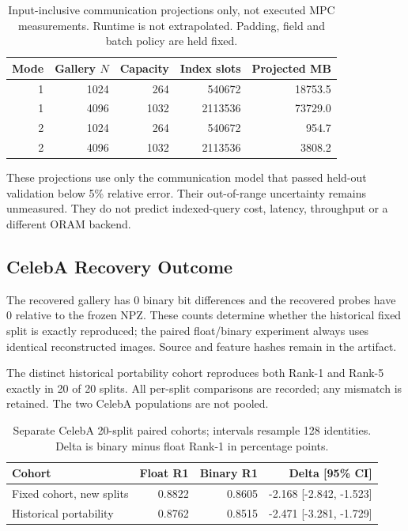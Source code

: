 \begin{table}[H]
\caption{Input-inclusive communication projections only, not executed MPC measurements. Runtime is not extrapolated. Padding, field and batch policy are held fixed.}
\label{tab:projections}\centering\small
\setlength{\tabcolsep}{3pt}
\begin{tabular}{rrrrr}
\toprule
Mode & Gallery $N$ & Capacity & Index slots & Projected MB \\
\midrule
1 & 1024 & 264 & 540672 & 18753.5 \\
1 & 4096 & 1032 & 2113536 & 73729.0 \\
2 & 1024 & 264 & 540672 & 954.7 \\
2 & 4096 & 1032 & 2113536 & 3808.2 \\
\bottomrule
\end{tabular}
\end{table}

These projections use only the communication model that passed held-out validation below 5\% relative error. Their out-of-range uncertainty remains unmeasured. They do not predict indexed-query cost, latency, throughput or a different ORAM backend.

\subsection{CelebA Recovery Outcome}

The recovered gallery has 0 binary bit differences and the recovered probes have 0 relative to the frozen NPZ. These counts determine whether the historical fixed split is exactly reproduced; the paired float/binary experiment always uses identical reconstructed images. Source and feature hashes remain in the artifact.

The distinct historical portability cohort reproduces both Rank-1 and Rank-5 exactly in 20 of 20 splits. All per-split comparisons are recorded; any mismatch is retained. The two CelebA populations are not pooled.

\begin{table}[H]
\caption{Separate CelebA 20-split paired cohorts; intervals resample 128 identities. Delta is binary minus float Rank-1 in percentage points.}
\label{tab:celeba_cohorts}\centering\small
\setlength{\tabcolsep}{3pt}
\begin{tabular}{lrrr}
\toprule
Cohort & Float R1 & Binary R1 & Delta [95\% CI] \\
\midrule
Fixed cohort, new splits & 0.8822 & 0.8605 & -2.168 [-2.842, -1.523] \\
Historical portability & 0.8762 & 0.8515 & -2.471 [-3.281, -1.729] \\
\bottomrule
\end{tabular}
\end{table}

